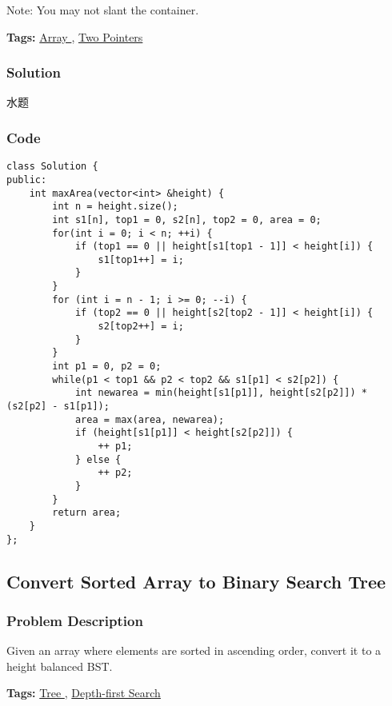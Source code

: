 \documentclass{article}
\begin{document}
\begin{CJK*}{UTF8}{gkai}
Note: You may not slant the container.


\textbf{Tags: }
\hyperref[ Array ]{ Array },  \hyperref[ Two Pointers ]{ Two Pointers }



\subsubsection*{Solution}
水题

\subsubsection*{Code}
\begin{lstlisting}
class Solution {
public:
    int maxArea(vector<int> &height) {
        int n = height.size();
        int s1[n], top1 = 0, s2[n], top2 = 0, area = 0;
        for(int i = 0; i < n; ++i) {
            if (top1 == 0 || height[s1[top1 - 1]] < height[i]) {
                s1[top1++] = i;
            }
        }
        for (int i = n - 1; i >= 0; --i) {
            if (top2 == 0 || height[s2[top2 - 1]] < height[i]) {
                s2[top2++] = i;
            }
        }
        int p1 = 0, p2 = 0;
        while(p1 < top1 && p2 < top2 && s1[p1] < s2[p2]) {
            int newarea = min(height[s1[p1]], height[s2[p2]]) * (s2[p2] - s1[p1]);
            area = max(area, newarea);
            if (height[s1[p1]] < height[s2[p2]]) {
                ++ p1;
            } else {
                ++ p2;
            }
        }
        return area;
    }
}; 
\end{lstlisting}


\subsection{ Convert Sorted Array to Binary Search Tree }
\label{ Convert Sorted Array to Binary Search Tree }

\subsubsection*{Problem Description}
Given an array where elements are sorted in ascending order, convert it to a height balanced BST.


\textbf{Tags: }
\hyperref[ Tree ]{ Tree },  \hyperref[ Depth-first Search ]{ Depth-first Search }




\end{CJK*}
\end{document}
